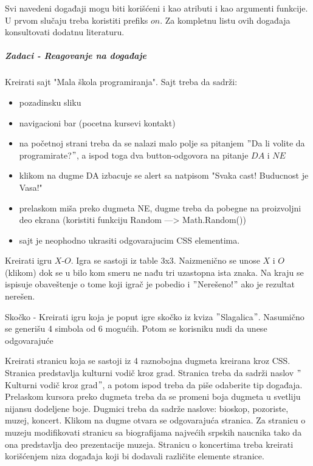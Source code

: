 Svi navedeni događaji mogu biti korišćeni i kao atributi i kao argumenti funkcije. U prvom slučaju treba koristiti prefiks $on$. Za kompletnu listu ovih događaja konsultovati dodatnu literaturu.

\subparagraph{Zadaci - Reagovanje na događaje}

\begin{primer}
Kreirati sajt "Mala škola programiranja". Sajt treba da sadrži:
\begin{itemize}
\item pozadinsku sliku
\item navigacioni bar (pocetna kursevi kontakt)
\item na početnoj strani treba da se nalazi malo polje sa pitanjem $"$Da li volite da
     programirate?$"$, a ispod toga dva button-odgovora na pitanje $DA$ i $NE$ 
\item klikom na dugme DA izbacuje se alert sa natpisom "Svaka cast! Buducnost je Vasa!"
\item prelaskom miša preko dugmeta NE, dugme treba da pobegne na proizvoljni deo ekrana
    (koristiti funkciju Random ---> Math.Random())
\item sajt je neophodno ukrasiti odgovarajucim CSS elementima. 
\end{itemize}
\end{primer}

\begin{primer}
Kreirati igru $X$-$O$. Igra se sastoji iz table $3$x$3$. Naizmenično se unose $X$ i $O$ (klikom) dok se u bilo kom smeru ne nađu tri uzastopna ista znaka. Na kraju se ispisuje obaveštenje o tome koji igrač je pobedio i $"$Nerešeno!$"$ ako je rezultat nerešen.
\end{primer}


\begin{primer}
Skočko - Kreirati igru koja je poput igre skočko iz kviza $"$Slagalica$"$. Nasumično se generišu 4 simbola od 6 mogućih. Potom se korisniku nudi da unese odgovarajuće
\end{primer}

\begin{primer}
Kreirati stranicu koja se sastoji iz 4 raznobojna dugmeta kreirana kroz CSS. Stranica predstavlja kulturni vodič kroz grad. Stranica treba da sadrži naslov $"$Kulturni vodič kroz grad$"$, a potom ispod treba da piše odaberite tip događaja. Prelaskom kursora preko dugmeta treba da se promeni boja dugmeta u svetliju nijansu dodeljene boje. Dugmici treba da sadrže naslove: bioskop, pozoriste, muzej, koncert. Klikom na dugme otvara se odgovarajuća stranica. Za stranicu o muzeju modifikovati stranicu sa biografijama najvećih srpskih naucnika tako da ona predstavlja deo prezentacije muzeja. Stranicu o koncertima treba kreirati korišćenjem niza događaja koji bi dodavali različite elemente stranice. 
\end{primer}
\newpage


